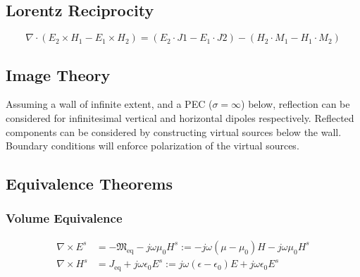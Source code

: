 \documentclass{article}
\numberwithin{equation}{section}
\begin{document}
        \subsection{Lorentz Reciprocity}
            \begin{equation}
                \label{eq:lorentzReciprocity}
                \nabla \cdot( E_2 \times H_1 - E_1 \times H_2 ) = ( E_2 \cdot J1 - E_1
                \cdot J2 ) - ( H_2 \cdot M_1 - H_1 \cdot M_2 )
            \end{equation}
        \subsection{Image Theory}
            Assuming a wall of infinite extent, and a PEC ($\sigma=\infty$) below,
            reflection can be considered for infinitesimal vertical and horizontal
            dipoles respectively. Reflected components can be considered by constructing
            virtual sources below the wall. Boundary conditions will enforce
            polarization of the virtual sources.
        \subsection{Equivalence Theorems}
            \subsubsection*{Volume Equivalence}
            \begin{subequations}
                \begin{align} \label{eq:VolumeEquivalence}
                    \nabla \times E^s &= -\mathfrak{M}_{\text{eq}} - j \omega \mu_0 H^s
                        := -j \omega( \mu - \mu_0 )H -j \omega \mu_0 H^s \\
                    \nabla \times H^s &= J_{\text{eq}} + j \omega \epsilon_0 E^s := j
                        \omega( \epsilon - \epsilon_0 )E + j \omega \epsilon_0 E^s
                \end{align}
            \end{subequations}
\end{document}

